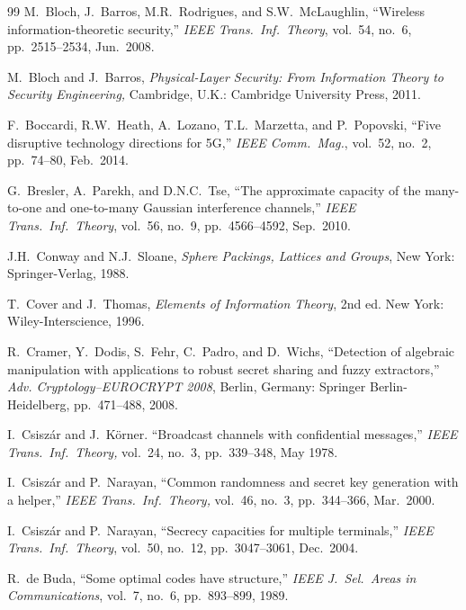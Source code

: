 \documentclass[main.tex]{subfiles}
\begin{document}
\begin{thebibliography}{99}
M.\ Bloch, J.\  Barros, M.R.\ Rodrigues, and S.W.\ McLaughlin, ``Wireless information-theoretic security,'' \emph{IEEE Trans.\ Inf.\ Theory}, vol.\ 54, no.\ 6, pp.\ 2515--2534, Jun.\ 2008.
 
M.~Bloch and J.~Barros, \emph{Physical-Layer Security: From Information Theory to Security Engineering,} Cambridge, U.K.: Cambridge University Press, 2011.
 
 F.\ Boccardi, R.W.\ Heath, A.\ Lozano, T.L.\ Marzetta, and P.\ Popovski, ``Five disruptive technology directions for 5G,''  \emph{IEEE Comm.\ Mag.}, vol.\ 52, no.\ 2, pp.\ 74--80, Feb.\ 2014.
 
 G.\ Bresler, A.\ Parekh,  and D.N.C.\ Tse, ``The approximate capacity of the many-to-one and one-to-many Gaussian interference channels,'' 
 \emph{IEEE Trans.\ Inf.\ Theory}, vol.\ 56, no.\ 9, pp.\ 4566--4592,  Sep.\ 2010.



J.H.\ Conway and N.J.\ Sloane, \emph{Sphere Packings, Lattices and Groups}, New York: Springer-Verlag, 1988.

T.~Cover and J.~Thomas, \emph{Elements of Information Theory}, 2nd ed. New York: Wiley-Interscience, 1996.

R.\ Cramer, Y.\ Dodis, S.\ Fehr, C.\ Padro, and D.\ Wichs, ``Detection of algebraic manipulation with applications to robust secret sharing and fuzzy extractors,'' \emph{Adv. Cryptology--EUROCRYPT 2008}, Berlin, Germany: Springer Berlin-Heidelberg, pp.\ 471--488, 2008.

I.~Csisz\'{a}r and J.~K\"{o}rner. ``Broadcast channels with confidential messages,'' \emph{IEEE Trans.\ Inf.\ Theory,} vol.\ 24, no.\ 3, pp.\ 339--348, May 1978.

 I.\ Csisz\'{a}r and P.\ Narayan, ``Common randomness and secret key generation with a helper,'' 
 \emph{IEEE Trans.\ Inf.\ Theory,} vol.\ 46, no.\ 3, pp.\ 344--366,
Mar.\ 2000.
 

I.~Csisz{\'a}r and P.~Narayan, ``Secrecy capacities for multiple terminals,''
\emph{IEEE Trans.\ Inf.\ Theory}, vol.\ 50, no.\ 12, pp.\ 3047--3061, Dec.\ 2004.




R.~de Buda, ``Some optimal codes have structure,'' \emph{IEEE J.\ Sel.\ Areas in Communications}, vol.\ 7, no.\ 6, pp.\ 893--899,
1989.


\end{thebibliography}
\end{document}
